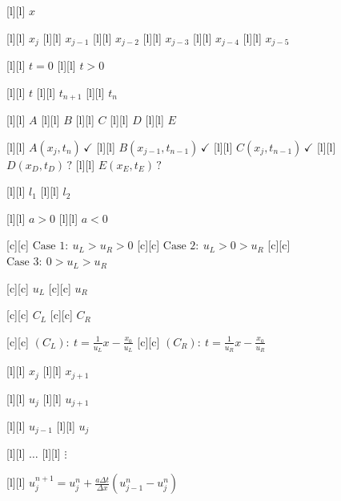 \begin{figure}[ht]
	\centering
	\footnotesize

	[l] {$x$}

	[l] {$x_{j}$}
	[l] {$x_{j-1}$}
	[l] {$x_{j-2}$}
	[l] {$x_{j-3}$}
	[l] {$x_{j-4}$}
	[l] {$x_{j-5}$}


	[l] {$t=0$}
	[l] {$t>0$}

	[l] {$t$}
	[l] {$t_{n+1}$}
	[l] {$t_{n}$}

	[l] {$A$}
	[l] {$B$}
	[l] {$C$}
	[l] {$D$}
	[l] {$E$}

	[l] {$A(x_j,t_n)\,\checkmark$}
	[l] {$B(x_{j-1},t_{n-1})\,\checkmark$}
	[l] {$C(x_{j},t_{n-1})\,\checkmark$}
	[l] {$D(x_D,t_D)\,?$}
	[l] {$E(x_E,t_E)\, ?$}

	[l] {$l_1$}
	[l] {$l_2$}

	[l] {$a>0$}
	[l] {$a<0$}

	[c] {$\text{Case }1:\ u_{L} > u_{R} > 0$}
	[c] {$\text{Case }2:\ u_{L} > 0 > u_{R}$}
	[c] {$\text{Case }3:\ 0 > u_{L} > u_{R}$}

	[c] {$u_{L}$}
	[c] {$u_{R}$}

	[c] {$C_L$}
	[c] {$C_R$}

	[c] {$\displaystyle (C_L):\ t=\frac{1}{u_{L}}x-\frac{x_{0}}{u_{L}}$}
	[c] {$\displaystyle (C_R):\ t=\frac{1}{u_{R}}x-\frac{x_{0}}{u_{R}}$}

	[l] {$x_{j}$}
	[l] {$x_{j+1}$}

	[l] {$u_{j}$}
	[l] {$u_{j+1}$}

	[l] {$u_{j-1}$}
	[l] {$u_{j}$}

	[l] {$\dots$}
	[l] {$\vdots$}

	[l] {$\displaystyle u_{j}^{n+1} = u_{j}^{n} + \frac{a\Delta t}{\Delta x}\left(u_{j-1}^{n}-u_{j}^{n}\right)$}


\end{figure}

